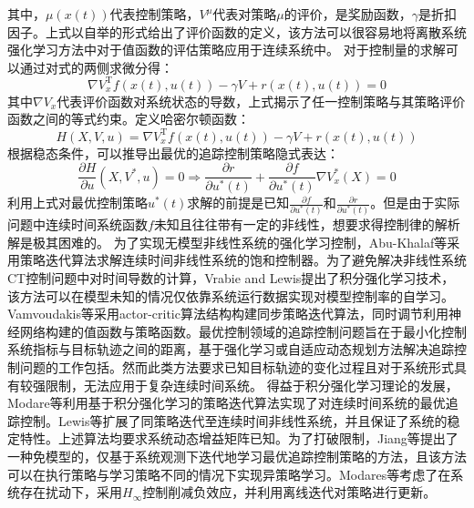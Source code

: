 其中，$\mu(x(t))$代表控制策略，$V^{\mu}$代表对策略$\mu$的评价，是奖励函数，$\gamma$是折扣因子。上式以自举的形式给出了评价函数的定义，该方法可以很容易地将离散系统强化学习方法中对于值函数的评估策略应用于连续系统中。
对于控制量的求解可以通过对式的两侧求微分得：
\begin{equation}
    \nabla V_x^{\mathrm{T}} f(x(t), u(t))-\gamma V+r(x(t), u(t))=0
\end{equation}
其中$\nabla V_x$代表评价函数对系统状态的导数，上式揭示了任一控制策略与其策略评价函数之间的等式约束。定义哈密尔顿函数：
\begin{equation}
    H(X, V, u)=\nabla V_x^{\mathrm{T}} f(x(t), u(t))-\gamma V+r(x(t), u(t))
\end{equation}
根据稳态条件，可以推导出最优的追踪控制策略隐式表达：
\begin{equation}
    \frac{\partial H}{\partial u}\left(X, V^*, u\right)=0 \Rightarrow \frac{\partial r}{\partial u^*(t)}+\frac{\partial f}{\partial u^*(t)} \nabla V_x^*(X)=0
\end{equation}
利用上式对最优控制策略$u^*(t)$求解的前提是已知$\frac{\partial f}{\partial u^*(t)}$和$\frac{\partial r}{\partial u^*(t)}$。但是由于实际问题中连续时间系统函数$f$未知且往往带有一定的非线性，想要求得控制律的解析解是极其困难的。
为了实现无模型非线性系统的强化学习控制，Abu-Khalaf等\cite{abu2005nearly}采用策略迭代算法求解连续时间非线性系统的饱和控制器。为了避免解决非线性系统CT控制问题中对时间导数的计算，Vrabie and Lewis\cite{vrabie2009neural}提出了积分强化学习技术，该方法可以在模型未知的情况仅依靠系统运行数据实现对模型控制率的自学习。
Vamvoudakis等\cite{vamvoudakis2014online}采用actor-critic算法结构构建同步策略迭代算法，同时调节利用神经网络构建的值函数与策略函数。最优控制领域的追踪控制问题旨在于最小化控制系统指标与目标轨迹之间的距离，基于强化学习或自适应动态规划方法解决追踪控制问题的工作包括\cite{zhang2008novel,kamalapurkar2015approximate}。然而此类方法要求已知目标轨迹的变化过程且对于系统形式具有较强限制，无法应用于复杂连续时间系统。
得益于积分强化学习理论的发展，Modare等\cite{modares2014linear}利用基于积分强化学习的策略迭代算法实现了对连续时间系统的最优追踪控制。Lewis等\cite{modares2014optimal}扩展了同策略迭代至连续时间非线性系统，并且保证了系统的稳定特性。上述算法均要求系统动态增益矩阵已知。为了打破限制，Jiang等\cite{jiang2012computational}提出了一种免模型的，仅基于系统观测下迭代地学习最优追踪控制策略的方法，且该方法可以在执行策略与学习策略不同的情况下实现异策略学习。Modares等\cite{modares2015h}考虑了在系统存在扰动下，采用$H_{\infty}$控制削减负效应，并利用离线迭代对策略进行更新。

